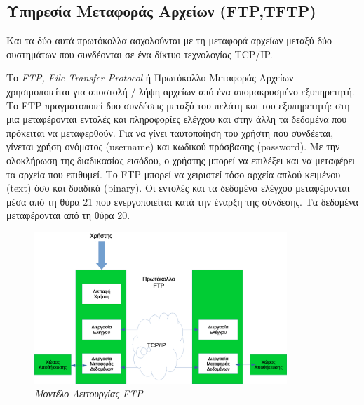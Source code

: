 %
%
\subsection{Υπηρεσία Μεταφοράς Αρχείων (FTP,TFTP)}

Και τα δύο αυτά πρωτόκολλα ασχολούνται με τη μεταφορά αρχείων μεταξύ δύο συστημάτων που συνδέονται σε ένα δίκτυο τεχνολογίας TCP/IP.

Το \emph{FTP, File Transfer Protocol} ή Πρωτόκολλο Μεταφοράς Αρχείων χρησιμοποιείται για αποστολή / λήψη αρχείων από ένα απομακρυσμένο εξυπηρετητή. Το FTP πραγματοποιεί δυο συνδέσεις μεταξύ του πελάτη και του εξυπηρετητή: στη μια μεταφέρονται εντολές και πληροφορίες ελέγχου και στην άλλη τα δεδομένα που πρόκειται να μεταφερθούν. Για να γίνει ταυτοποίηση του χρήστη που συνδέεται, γίνεται χρήση ονόματος (username) και κωδικού πρόσβασης (password). Με την ολοκλήρωση της διαδικασίας εισόδου, ο χρήστης μπορεί να επιλέξει και να μεταφέρει τα αρχεία που επιθυμεί. Το FTP μπορεί να χειριστεί τόσο αρχεία απλού κειμένου (text) όσο και δυαδικά (binary). Οι εντολές και τα δεδομένα ελέγχου μεταφέρονται μέσα από τη θύρα 21 που ενεργοποιείται κατά την έναρξη της σύνδεσης. Τα δεδομένα μεταφέρονται από τη θύρα 20.

\begin{figure}[!ht]
 \centering
 \includegraphics[width=0.85\textwidth]{images/chapter6/6-8}
 \caption {\textsl{Μοντέλο Λειτουργίας FTP}}
 \label{6-8}
\end{figure}

